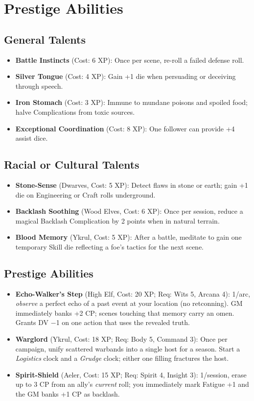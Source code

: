 \section{Prestige Abilities}

\subsection{General Talents}
\begin{itemize}
    \item \textbf{Battle Instincts} (Cost: 6 XP): Once per scene, re-roll a failed defense roll.
    \item \textbf{Silver Tongue} (Cost: 4 XP): Gain +1 die when persuading or deceiving through speech.
    \item \textbf{Iron Stomach} (Cost: 3 XP): Immune to mundane poisons and spoiled food; halve Complications from toxic sources.
    \item \textbf{Exceptional Coordination} (Cost: 8 XP): One follower can provide +4 assist dice.
\end{itemize}

\subsection{Racial or Cultural Talents}
\begin{itemize}
    \item \textbf{Stone-Sense} (Dwarves, Cost: 5 XP): Detect flaws in stone or earth; gain +1 die on Engineering or Craft rolls underground.
    \item \textbf{Backlash Soothing} (Wood Elves, Cost: 6 XP): Once per session, reduce a magical Backlash Complication by 2 points when in natural terrain.
    \item \textbf{Blood Memory} (Ykrul, Cost: 5 XP): After a battle, meditate to gain one temporary Skill die reflecting a foe's tactics for the next scene.
\end{itemize}

\subsection{Prestige Abilities}
\begin{itemize}
    \item \textbf{Echo-Walker's Step} (High Elf, Cost: 20 XP; Req: Wits 5, Arcana 4): 
1/arc, \emph{observe} a perfect echo of a past event at your location (no retconning). 
GM immediately banks +2 CP; scenes touching that memory carry an omen. Grants DV −1 on one action that uses the revealed truth.
    \item \textbf{Warglord} (Ykrul, Cost: 18 XP; Req: Body 5, Command 3): 
Once per campaign, unify scattered warbands into a single host for a season. Start a \emph{Logistics} clock and a \emph{Grudge} clock; either one filling fractures the host.
    \item \textbf{Spirit-Shield} (Aeler, Cost: 15 XP; Req: Spirit 4, Insight 3): 
1/session, erase up to 3 CP from an ally's \emph{current} roll; you immediately mark Fatigue +1 and the GM banks +1 CP as backlash.
\end{itemize}

